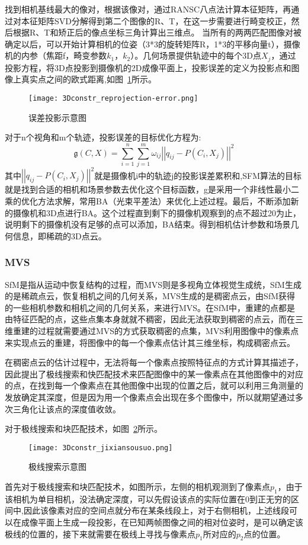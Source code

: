 找到相机基线最大的像对，根据该像对，通过RANSC八点法计算本征矩阵，再通过对本征矩阵SVD分解得到第二个图像的R、T，在这一步需要进行畸变校正，然后根据R、T和矫正后的像点坐标三角计算出三维点。
当所有的两两匹配图像对被确定以后，可以开始计算相机的位姿（3*3的旋转矩阵R，1*3的平移向量t），摄像机的内参（焦距f，畸变参数$k_1$，$k_2$）。几何场景提供轨迹中的每个3D点$X_j$，通过投影方程，将3D点投影到摄像机的2D成像平面上，投影误差的定义为投影点和图像上真实点之间的欧式距离,如图~\ref{fig:3Dconstr_reprojection-error}所示。
\begin{figure}[H] %
  \centering
  \texttt{[image: 3Dconstr\_reprojection-error.png]}
  \caption{误差投影示意图}
  \label{fig:3Dconstr_reprojection-error}
\end{figure}
对于n个视角和m个轨迹，投影误差的目标优化方程为:
\begin{equation}
  \mathfrak g(C,X)=\sum_{i=1}^n\sum_{j=1}^m\omega_{ij}\left|\left|q_{ij}-P(C_i,X_j)\right|\right|^2
\end{equation}
其中$\left|\left|q_{ij}-P(C_i,X_j)\right|\right|^2$就是摄像机i中的轨迹j的投影误差累积和,SFM算法的目标就是找到合适的相机和场景参数去优化这个目标函数，g是采用一个非线性最小二乘的优化方法求解，常用BA（光束平差法）来优化上述过程。最后，不断添加新的摄像机和3D点进行BA。这个过程直到剩下的摄像机观察到的点不超过20为止，说明剩下的摄像机没有足够的点可以添加，BA结束。得到相机估计参数和场景几何信息，即稀疏的3D点云。
\subsubsection{MVS} 
\label{sec:3.2.2.4}
SfM是指从运动中恢复结构的过程，而MVS则是多视角立体视觉生成统，SfM生成的是稀疏点云，恢复相机之间的几何关系，MVS生成的是稠密点云，由SfM获得的一些相机参数和相机之间的几何关系，来进行MVS。在SfM中，重建的点都是由特征匹配的点，这些点集本身就就不稠密，因此无法获取到稠密的点云，而在三维重建的过程就需要通过MVS的方式获取稠密的点集，MVS利用图像中的像素点来实现点云的重建，将图像中的每一个像素点估计其三维坐标，构成稠密点云。

在稠密点云的估计过程中，无法将每一个像素点按照特征点的方式计算其描述子，因此提出了极线搜索和快匹配技术来匹配图像中的某一像素点在其他图像中的对应的点，在找到每一个像素点在其他图像中出现的位置之后，就可以利用三角测量的发放确定其深度，但是因为用一个像素点会出现在多个图像中，所以就期望通过多次三角化让该点的深度值收敛。

对于极线搜索和块匹配技术，如图~\ref{fig:3Dconstr_jixiansousuo}所示。
\begin{figure}[H] %
  \centering
  \texttt{[image: 3Dconstr\_jixiansousuo.png]}
  \caption{极线搜索示意图}
  \label{fig:3Dconstr_jixiansousuo}
\end{figure}
首先对于极线搜索和块匹配技术，如图所示，左侧的相机观测到了像素点$p_1$，由于该相机为单目相机，没法确定深度，可以先假设该点的实际位置在0到正无穷的区间中,因此该像素对应的空间点就分布在某条线段上，对于右侧相机，上述线段可以在成像平面上生成一段投影，在已知两帧图像之间的相对位姿时，是可以确定该极线的位置的，接下来就需要在极线上寻找与像素点$p_1$所对应的$p_2$点的位置。

